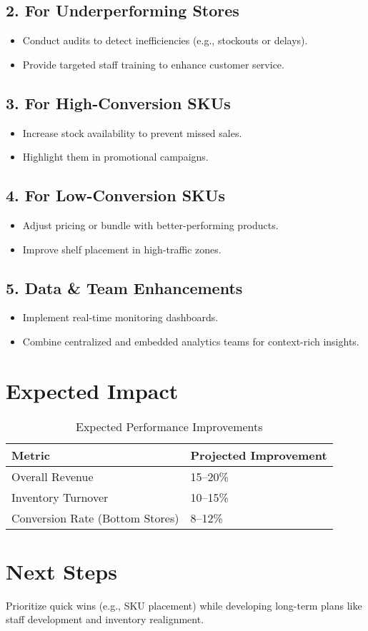 \documentclass[11pt,a4paper]{article}
\begin{document}
\subsection*{2. For Underperforming Stores}
\begin{itemize}
    \item Conduct audits to detect inefficiencies (e.g., stockouts or delays).
    \item Provide targeted staff training to enhance customer service.
\end{itemize}

\subsection*{3. For High-Conversion SKUs}
\begin{itemize}
    \item Increase stock availability to prevent missed sales.
    \item Highlight them in promotional campaigns.
\end{itemize}

\subsection*{4. For Low-Conversion SKUs}
\begin{itemize}
    \item Adjust pricing or bundle with better-performing products.
    \item Improve shelf placement in high-traffic zones.
\end{itemize}

\subsection*{5. Data \& Team Enhancements}
\begin{itemize}
    \item Implement real-time monitoring dashboards.
    \item Combine centralized and embedded analytics teams for context-rich insights.
\end{itemize}

\section*{Expected Impact}
\begin{table}[H]
    \centering
    \renewcommand{\arraystretch}{1.3}
    \begin{tabular}{@{}ll@{}}
        \toprule
        \textbf{Metric} & \textbf{Projected Improvement} \\
        \midrule
        Overall Revenue & 15--20\% \\
        Inventory Turnover & 10--15\% \\
        Conversion Rate (Bottom Stores) & 8--12\% \\
        \bottomrule
    \end{tabular}
    \caption{Expected Performance Improvements}
\end{table}

\section*{Next Steps}
Prioritize quick wins (e.g., SKU placement) while developing long-term plans like staff development and inventory realignment.
\end{document}
